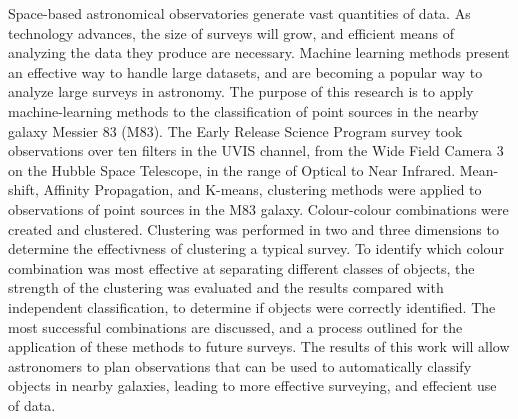 ﻿%
Space-based astronomical observatories generate vast quantities of data.
As technology advances, the size of surveys will grow, and efficient means of analyzing the data they produce are necessary.
Machine learning methods present an effective way to handle large datasets, and are becoming a popular way to analyze large surveys in astronomy.
The purpose of this research is to apply machine-learning methods to the classification of point sources in the nearby galaxy Messier 83 (M83).
The Early Release Science Program survey took observations over ten filters in the UVIS channel, from the Wide Field Camera 3 on the Hubble Space Telescope, in the range of Optical to Near Infrared.
Mean-shift, Affinity Propagation, and K-means, clustering methods were applied to observations of point sources in the M83 galaxy.
Colour-colour combinations were created and clustered.
Clustering was performed in two and three dimensions to determine the effectivness of clustering a typical survey.
To identify which colour combination was most effective at separating different classes of objects, the strength of the clustering was evaluated and the results compared with independent classification, to determine if objects were correctly identified.
The most successful combinations are discussed, and a process outlined for the application of these methods to future surveys.
The results of this work will allow astronomers to plan observations that can be used to automatically classify objects in nearby galaxies, leading to more effective surveying, and effecient use of data.